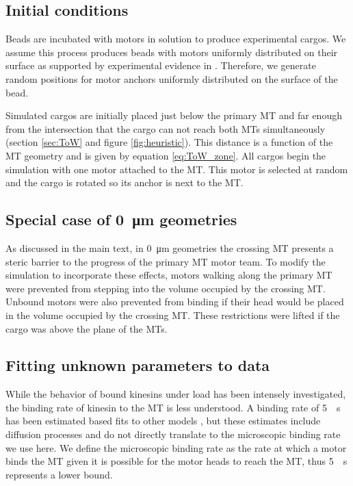 \subsection{Initial conditions}

Beads are incubated with motors in solution to produce experimental cargos. We assume this process produces beads with motors uniformly distributed on their surface as supported by experimental evidence in \cite{Li2016}. Therefore, we generate random positions for motor anchors uniformly distributed on the surface of the bead.

Simulated cargos are initially placed just below the primary MT and far enough from the intersection that the cargo can not reach both MTs simultaneously (section \ref{sec:ToW} and figure \ref{fig:heuristic}). This distance is a function of the MT geometry and is given by equation \ref{eq:ToW_zone}. All cargos begin the simulation with one motor attached to the MT. This motor is selected at random and the cargo is rotated so its anchor is next to the MT.

\subsection{Special case of \SI{0}{\micro\meter} geometries} \label{sec:0micron}

As discussed in the main text, in \SI{0}{\micro\meter} geometries the crossing MT presents a steric barrier to the progress of the primary MT motor team. To modify the simulation to incorporate these effects, motors walking along the primary MT were prevented from stepping into the volume occupied by the crossing MT. Unbound motors were also prevented from binding if their head would be placed in the volume occupied by the crossing MT. These restrictions were lifted if the cargo was above the plane of the MTs.

\subsection{Fitting unknown parameters to data} \label{param_fit}

While the behavior of bound kinesins under load has been intensely investigated, the binding rate of kinesin to the MT is less understood. A binding rate of \SI{5}{\per\second} has been estimated based fits to other models \cite{Leduc2004,Klumpp2005}, but these estimates include diffusion processes and do not directly translate to the microscopic binding rate we use here. We define the microscopic binding rate as the rate at which a motor binds the MT given it is possible for the motor heads to reach the MT, thus \SI{5}{\per\second} represents a lower bound.

